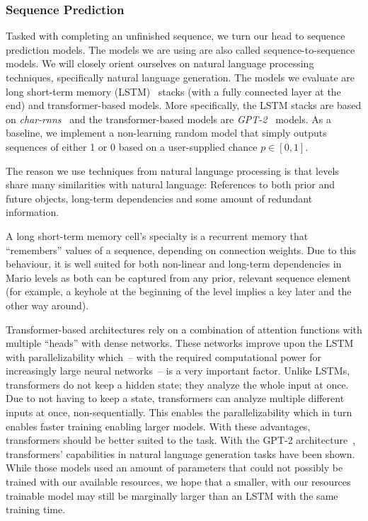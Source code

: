 \subsubsection{Sequence Prediction}

Tasked with completing an unfinished sequence, we turn our head to
sequence prediction models. The models we are using are also called
sequence-to-sequence models. We will closely orient ourselves on
natural language processing techniques, specifically natural language
generation. The models we evaluate are long short-term memory
(LSTM)~\cite{hochreiterLongShorttermMemory1997} stacks (with a
fully connected layer at the end) and transformer-based models. More
specifically, the LSTM stacks are based on
\emph{char-rnns}~\cite{andrejKarpathyCharrnn2019} and the
transformer-based models are
\emph{GPT-2}~\cite{radfordLanguageModelsAre,OpenaiGpt22019} models. As
a baseline, we implement a non-learning random model that simply
outputs sequences of either 1 or 0 based on a user-supplied chance
$p \in [0, 1]$.

The reason we use techniques from natural language processing is that
levels share many similarities with natural language: References to
both prior and future objects, long-term dependencies and some amount
of redundant information.

A long short-term memory cell's specialty is a recurrent memory that
``remembers'' values of a sequence, depending on connection weights.
Due to this behaviour, it is well suited for both non-linear and
long-term dependencies in Mario levels as both can be captured from
any prior, relevant sequence element (for example, a keyhole at the
beginning of the level implies a key later and the other way around).

Transformer-based architectures rely on a combination of attention
functions with multiple ``heads'' with dense networks. These networks
improve upon the LSTM with parallelizability which~-- with the
required computational power for increasingly large neural networks~--
is a very important factor. Unlike LSTMs, transformers do not keep a
hidden state; they analyze the whole input at once. Due to not having
to keep a state, transformers can analyze multiple different inputs at
once, non-sequentially. This enables the parallelizability which in
turn enables faster training enabling larger models. With these
advantages, transformers should be better suited to the task. With the
GPT-2 architecture~\cite{radfordLanguageModelsAre}, transformers'
capabilities in natural language generation tasks have been shown.
While those models used an amount of parameters that could not
possibly be trained with our available resources, we hope that a
smaller, with our resources trainable model may still be marginally
larger than an LSTM with the same training time.

